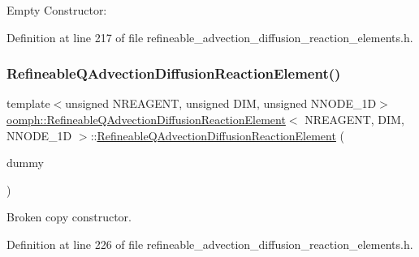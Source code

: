 Empty Constructor\+: 



Definition at line 217 of file refineable\+\_\+advection\+\_\+diffusion\+\_\+reaction\+\_\+elements.\+h.

\mbox{\label{classoomph_1_1RefineableQAdvectionDiffusionReactionElement_ab29a65971bc16a71f6cd03386f836556}} 
\subsubsection{\texorpdfstring{Refineable\+Q\+Advection\+Diffusion\+Reaction\+Element()}{RefineableQAdvectionDiffusionReactionElement()}\hspace{0.1cm}{\footnotesize\ttfamily [2/2]}}
{\footnotesize\ttfamily template$<$unsigned N\+R\+E\+A\+G\+E\+NT, unsigned D\+IM, unsigned N\+N\+O\+D\+E\+\_\+1D$>$ \\
\hyperlink{classoomph_1_1RefineableQAdvectionDiffusionReactionElement}{oomph\+::\+Refineable\+Q\+Advection\+Diffusion\+Reaction\+Element}$<$ N\+R\+E\+A\+G\+E\+NT, D\+IM, N\+N\+O\+D\+E\+\_\+1D $>$\+::\hyperlink{classoomph_1_1RefineableQAdvectionDiffusionReactionElement}{Refineable\+Q\+Advection\+Diffusion\+Reaction\+Element} (\begin{DoxyParamCaption}\item[{const \hyperlink{classoomph_1_1RefineableQAdvectionDiffusionReactionElement}{Refineable\+Q\+Advection\+Diffusion\+Reaction\+Element}$<$ N\+R\+E\+A\+G\+E\+NT, D\+IM, N\+N\+O\+D\+E\+\_\+1D $>$ \&}]{dummy }\end{DoxyParamCaption})\hspace{0.3cm}{\ttfamily [inline]}}



Broken copy constructor. 



Definition at line 226 of file refineable\+\_\+advection\+\_\+diffusion\+\_\+reaction\+\_\+elements.\+h.



